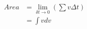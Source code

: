 \documentclass[preview]{standalone}
\begin{document}
\begin{align*}
Area&=\lim_{\delta t\to 0} (\sum v\Delta t ) \\ &=\int v dv
\end{align*}
\end{document}

